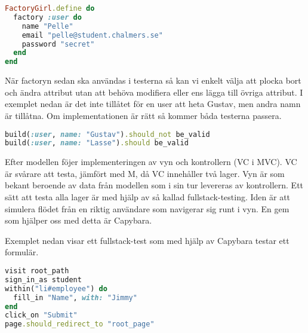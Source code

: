 \begin{lstlisting}[language=Ruby]
FactoryGirl.define do
  factory :user do
    name "Pelle"
    email "pelle@student.chalmers.se"
    password "secret"
  end
end
\end{lstlisting}

När factoryn sedan ska användas i testerna så kan vi enkelt välja att plocka bort och ändra attribut utan att behöva modifiera eller ens lägga till övriga attribut. I exemplet nedan är det inte tillåtet för en user att heta Gustav, men andra namn är tillåtna. Om implementationen är rätt så kommer båda testerna passera.

\begin{lstlisting}[language=Ruby]
build(:user, name: "Gustav").should_not be_valid
build(:user, name: "Lasse").should be_valid
\end{lstlisting}

Efter modellen föjer implementeringen av vyn och kontrollern (VC i MVC). VC är svårare att testa, jämfört med M, då VC innehåller två lager. Vyn är som bekant beroende av data från modellen som i sin tur levereras av kontrollern. Ett sätt att testa alla lager är med hjälp av så kallad fullstack-testing. Iden är att simulera flödet från en riktig användare som navigerar sig runt i vyn. En gem som hjälper oss med detta är Capybara.

Exemplet nedan visar ett fullstack-test som med hjälp av Capybara testar ett formulär.

\begin{lstlisting}[language=Ruby]
visit root_path
sign_in_as student
within("li#employee") do
  fill_in "Name", with: "Jimmy"
end
click_on "Submit"
page.should_redirect_to "root_page"
\end{lstlisting}
